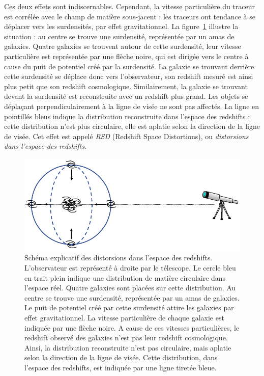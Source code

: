 Ces deux effets sont indiscernables. Cependant, la vitesse particulière du traceur est corrélée avec le champ de matière sous-jacent : les traceurs ont tendance à se déplacer vers les surdensités, par effet gravitationnel. La figure~\ref{fig:schema_rsd} illustre la situation : au centre se trouve une surdensité, représentée par un amas de galaxies. Quatre galaxies se trouvent autour de cette surdensité, leur vitesse particulière est représentée par une flèche noire, qui est dirigée vers le centre à cause du puit de potentiel créé par la surdensité. La galaxie se trouvant derrière cette surdensité se déplace donc vers l'observateur, son redshift mesuré est ainsi plus petit que son redshift cosmologique. Similairement, la galaxie se trouvant devant la surdensité est reconstruite avec un redshift plus grand. Les objets se déplaçant perpendiculairement à la ligne de visée ne sont pas affectés. La ligne en pointillés bleus indique la distribution reconstruite dans l'espace des redshifts : cette distribution n'est plus circulaire, elle est aplatie selon la direction de la ligne de visée. Cet effet est appelé \emph{RSD} (Redshift Space Distortions), ou \emph{distorsions dans l'espace des redshifts}.
\begin{figure}
  \centering
  \includegraphics[scale=0.4]{schema_rsd}
  \caption{Schéma explicatif des distorsions dans l'espace des redshifts. L'observateur est représenté à droite par le télescope. Le cercle bleu en trait plein indique une distribution de matière circulaire dans l'espace réel. Quatre galaxies sont placées sur cette distribution. Au centre se trouve une surdensité, représentée par un amas de galaxies. Le puit de potentiel créé par cette surdensité attire les galaxies par effet gravitationnel. La vitesse particulière de chaque galaxie est indiquée par une flèche noire. A cause de ces vitesses particulières, le redshift observé des galaxies n'est pas leur redshift cosmologique. Ainsi, la distribution reconstruite n'est pas circulaire, mais aplatie selon la direction de la ligne de visée. Cette distribution, dans l'espace des redshifts, est indiquée par une ligne tiretée bleue.}
  \label{fig:schema_rsd}
\end{figure}

